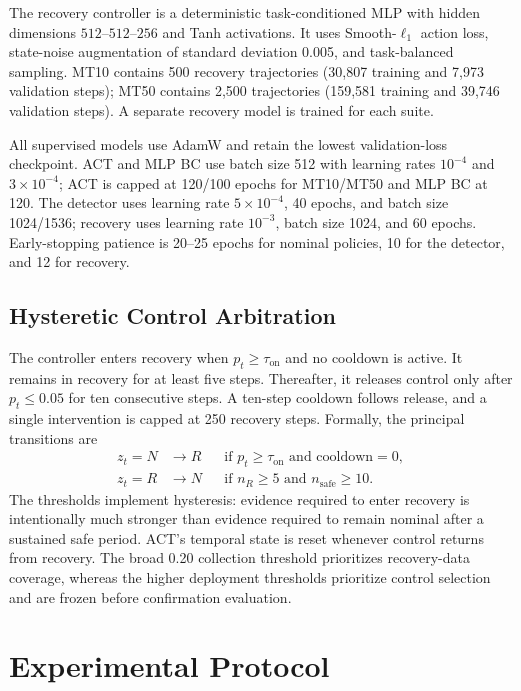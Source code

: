 \documentclass[conference]{IEEEtran}
\newcommand{\risk}{p_t}
\begin{document}
The recovery controller is a deterministic task-conditioned MLP with hidden dimensions $512$--$512$--$256$ and Tanh activations. It uses Smooth-$\ell_1$ action loss, state-noise augmentation of standard deviation 0.005, and task-balanced sampling. MT10 contains 500 recovery trajectories (30,807 training and 7,973 validation steps); MT50 contains 2,500 trajectories (159,581 training and 39,746 validation steps). A separate recovery model is trained for each suite.

All supervised models use AdamW and retain the lowest validation-loss checkpoint. ACT and MLP BC use batch size 512 with learning rates $10^{-4}$ and $3\times10^{-4}$; ACT is capped at 120/100 epochs for MT10/MT50 and MLP BC at 120. The detector uses learning rate $5\times10^{-4}$, 40 epochs, and batch size 1024/1536; recovery uses learning rate $10^{-3}$, batch size 1024, and 60 epochs. Early-stopping patience is 20--25 epochs for nominal policies, 10 for the detector, and 12 for recovery.

\subsection{Hysteretic Control Arbitration}
The controller enters recovery when $\risk\geq\tau_{\mathrm{on}}$ and no cooldown is active. It remains in recovery for at least five steps. Thereafter, it releases control only after $\risk\leq0.05$ for ten consecutive steps. A ten-step cooldown follows release, and a single intervention is capped at 250 recovery steps. Formally, the principal transitions are
\begin{align}
 z_t=N &\rightarrow R &&\text{if } \risk\geq\tau_{\mathrm{on}} \text{ and cooldown}=0,\\
 z_t=R &\rightarrow N &&\text{if } n_R\geq5 \text{ and } n_{\mathrm{safe}}\geq10.
\end{align}
The thresholds implement hysteresis: evidence required to enter recovery is intentionally much stronger than evidence required to remain nominal after a sustained safe period. ACT's temporal state is reset whenever control returns from recovery.
The broad 0.20 collection threshold prioritizes recovery-data coverage, whereas the higher deployment thresholds prioritize control selection and are frozen before confirmation evaluation.

\section{Experimental Protocol}
\label{sec:protocol}
\end{document}
